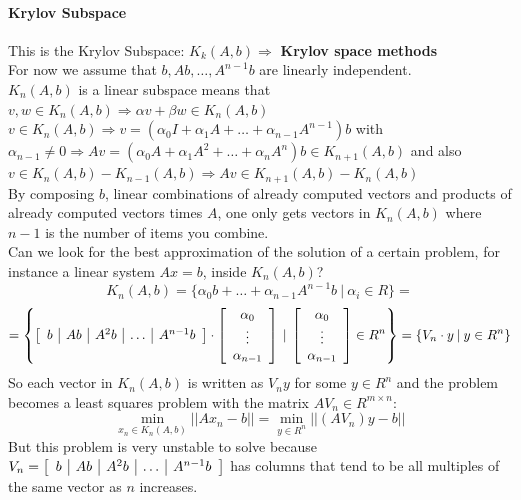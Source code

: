 \documentclass[10pt]{report}
\begin{document}
\paragraph{Krylov Subspace} This is the Krylov Subspace: $K_k(A,b)\Rightarrow$ \textbf{Krylov space methods}\\
For now we assume that $b, Ab, \ldots, A^{n-1}b$ are linearly independent.\\
$K_n(A,b)$ is a linear subspace means that $v,w\in K_n(A,b)\Rightarrow \alpha v+\beta w\in K_n(A,b)$\\
$v\in K_n(A,b)\Rightarrow v=(\alpha_0 I + \alpha_1 A + \ldots + \alpha_{n-1} A^{n-1})b$ with $\alpha_{n-1}\neq 0 \Rightarrow Av = (\alpha_0A + \alpha_1 A^2+\ldots + \alpha_n A^n)b \in K_{n+1}(A,b)$ and also $v\in K_n(A,b) - K_{n-1}(A,b)\Rightarrow Av \in K_{n+1}(A,b)- K_n(A,b)$\\
By composing $b$, linear combinations of already computed vectors and products of already computed vectors times $A$, one only gets vectors in $K_n(A,b)$ where $n-1$ is the number of items you combine.\\ %
Can we look for the best approximation of the solution of a certain problem, for instance a linear system $Ax=b$, inside $K_n(A,b)$?
$$K_n(A,b) = \{\alpha_0b+\ldots + \alpha_{n-1}A^{n-1}b\:|\:\alpha_i\in R\} =$$ $$= \left\{\left[\begin{array}{c | c | c | c | c}
b & Ab &A^2b & \ldots & A^{n-1}b
\end{array}\right]\cdot\left[\begin{array}{c}
\alpha_0\\\vdots\\\alpha_{n-1}
\end{array}\right]\:|\:\left[\begin{array}{c}
\alpha_0\\\vdots\\\alpha_{n-1}
\end{array}\right]\in R^n \right\} = \{V_n\cdot y\:|\:y \in R^n\}$$
So each vector in $K_n(A,b)$ is written as $V_ny$ for some $y\in R^n$ and the problem becomes a least squares problem with the matrix $AV_n\in R^{m\times n}$:
$$\min_{x_n\in K_n(A,b)} ||Ax_n - b|| = \min_{y\in R^n} ||(AV_n)y-b||$$
But this problem is very unstable to solve because $V_n = \left[\begin{array}{c | c | c | c | c}
b & Ab &A^2b & \ldots & A^{n-1}b
\end{array}\right]$ has columns that tend to be all multiples of the same vector as $n$ increases.
\end{document}

